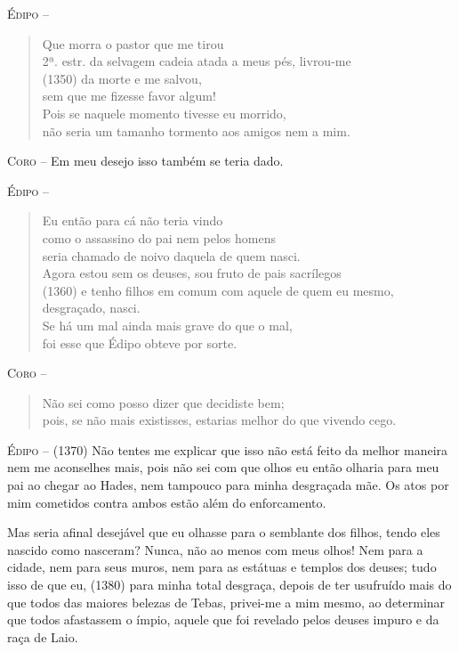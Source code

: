 \textsc{Édipo} -- \begin{verse}Que morra o pastor que me tirou\\ 2ª. estr.
da selvagem cadeia atada a meus pés, livrou-me\\ (1350)
da morte e me salvou,\\
sem que me fizesse favor algum!\\
Pois se naquele momento tivesse eu morrido,\\
não seria um tamanho tormento aos amigos nem a mim.
\end{verse}

\textsc{Coro} --   Em meu desejo isso também se teria dado.

\textsc{Édipo} -- \begin{verse}Eu então para cá não teria vindo\\
como o assassino do pai nem pelos homens\\
seria chamado de noivo daquela de quem nasci.\\
Agora estou sem os deuses, sou fruto de pais sacrílegos\\ (1360)
e tenho filhos em comum com aquele de quem eu mesmo, desgraçado, nasci.\\
Se há um mal ainda mais grave do que o mal,\\
foi esse que Édipo obteve por sorte.
\end{verse}

\textsc{Coro} -- \begin{verse}Não sei como posso dizer que decidiste bem;\\
pois, se não mais existisses, estarias melhor do que vivendo cego.
\end{verse}

\textsc{Édipo} --   (1370) Não tentes me explicar que isso não está feito da melhor maneira
nem me aconselhes mais, pois não sei com que olhos eu então olharia para
meu pai ao chegar ao Hades, nem tampouco para minha desgraçada mãe. Os
atos por mim cometidos contra ambos estão além do enforcamento.

Mas seria afinal desejável que eu olhasse para o semblante dos filhos,
tendo eles nascido como nasceram? Nunca, não ao menos com meus olhos!
Nem para a cidade, nem para seus muros, nem para as estátuas e templos
dos deuses; tudo isso de que eu, (1380) para minha total desgraça,
depois de ter usufruído mais do que todos das maiores belezas de Tebas,
privei-me a mim mesmo, ao determinar que todos afastassem o ímpio,
aquele que foi revelado pelos deuses impuro e da raça de Laio.

